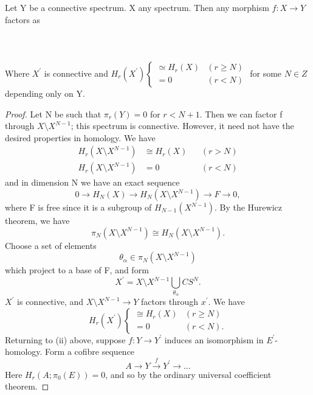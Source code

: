 \documentclass[../main]{subfiles}
\begin{document}
\begin{lemma} \label{lem:p3ch14.14}
Let Y be a connective spectrum. X any spectrum. Then any morphism $f\colon  X \to  Y $ factors as 
~\\~\\
~\\~\\
Where $X^{\prime}$ is connective and $H_{r}(X^{\prime}) \begin{cases}\simeq H_{r}(X) & (r \ge N)\\ =0 & (r < N)\end{cases}$ for some $N \in Z$ depending only on Y. 
\begin{proof} 
  Let N be such that $\pi_{r}(Y)=0$ for $r < N + 1$. Then we can factor f through  $X\setminus X^{N-1}$; this spectrum is connective. However, it need not have the desired properties in homology. We have
  \begin{align*}
    H_{r}(X \setminus X^{N-1}) &\cong H_{r}(X) &&(r > N) \\[0.5em]
    H_{r}(X \setminus X^{N-1}) &= 0   &&(r < N)
  \end{align*}
  and in dimension N we have an exact sequence 
  $$
    0 \to H_{N}(X) \to H_{N} (X \setminus X^{N-1}) \to F \to 0,
  $$ 
  where F is free since it is a subgroup of $H_{N-1}(X^{N-1})$. By the Hurewicz theorem, we have 
  $$
    \pi_{N}(X \setminus X^{N-1})\cong H_{N} (X \setminus X^{N-1}). 
  $$ 
  Choose a set of elements
  $$
    \theta_{\alpha} \in \pi_{N}(X \setminus X^{N-1})
  $$ 
  which project to a base of F, and form
  $$
    X^{\prime} = X \setminus X^{N-1} \bigcup_{\theta_{\alpha}} CS^N. 
  $$ 
  $X^{\prime}$ is connective, and $X \setminus X^{N-1} \to Y$ factors through $x^{\prime}$. We have
  $$
  H_{r}(X^{\prime})
    \begin{cases} 
      \cong H_{r}(X) & (r \ge N)\\
      =0 & (r < N).
    \end{cases}
  $$ 
  Returning to (ii) above, suppose $f\colon  Y \to  Y^{\prime} $ induces an isomorphism in $E^{\prime}$-homology. Form a cofibre sequence 
  $$
    A \to Y \xrightarrow{f} Y^{\prime} \to \ldots
  $$ 
  Here  $H_{r}(A;\pi_{0}(E))=0$, and so by the ordinary universal coefficient theorem.

\end{proof}
\end{lemma}
\end{document}
